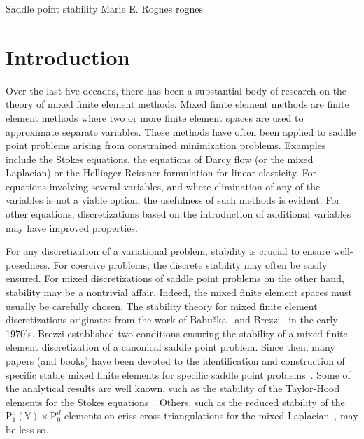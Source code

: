               {Saddle point stability}
              {Marie E. Rognes}
              {rognes}

\newcommand{\rognesforalls}{\forall \;}
\newcommand{\rognesc}{c}
\newcommand{\rognestriang}{\mathcal{T}}
\newcommand{\rognescodeintext}[1]{\texttt{\small #1}}

\newcommand{\rognescg}{\mathrm{P}^c}
\newcommand{\rognesrt}{\mathrm{RT}}
\newcommand{\rognesdg}{\mathrm{P}^d}
\newcommand{\rognesascot}{ASCoT}
\newcommand{\rognespython}{python}

\section{Introduction}

Over the last five decades, there has been a substantial body of
research on the theory of mixed finite element methods.  Mixed finite
element methods are finite element methods where two or more finite
element spaces are used to approximate separate variables.  These
methods have often been applied to saddle point problems arising from
constrained minimization problems. Examples include the Stokes
equations, the equations of Darcy flow (or the mixed Laplacian) or the
Hellinger-Reissner formulation for linear elasticity.  For equations
involving several variables, and where elimination of any of the
variables is not a viable option, the usefulness of such methods is
evident. For other equations, discretizations based on the
introduction of additional variables may have improved properties.

For any discretization of a variational problem, stability is crucial
to ensure well-posedness. For coercive problems, the discrete
stability may often be easily ensured. For mixed discretizations of
saddle point problems on the other hand, stability may be a nontrivial
affair. Indeed, the mixed finite element spaces must usually be
carefully chosen. The stability theory for mixed finite element
discretizations originates from the work of Babu\v
ska~\cite{Babuvska1972/73} and Brezzi~\cite{Brezzi1974} in the early
1970's. Brezzi established two conditions ensuring the stability of a
mixed finite element discretization of a canonical saddle point
problem.  Since then, many papers (and books) have been devoted to the
identification and construction of specific stable mixed finite
elements for specific saddle point
problems~\cite{ArnoldFalkWinther2006, BrezziDouglasMarini1985,
BrezziFalk1991, BrezziFortin1991, RaviartThomas1977,
TaylorHood1973}. Some of the analytical results are well known, such
as the stability of the Taylor-Hood elements for the Stokes
equations~\cite{BrezziFalk1991, stenberg:1984, TaylorHood1973}.
Others, such as the reduced stability of the
$\rognescg_1(\mathbb{V}) \times \rognesdg_0$ elements on criss-cross
triangulations for the mixed Laplacian~\cite{BoffiBrezzi1974aGastaldi2000},
may be less so.

